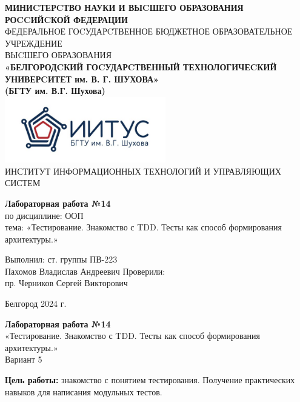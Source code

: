 \documentclass[a4paper,14pt]{extarticle}
\newcommand\textbox[1]{
	\parbox{.45\textwidth}{#1}
}
\begin{document}
\begin{center}
    \small{
        \textbf{МИНИCТЕРCТВО НАУКИ И ВЫCШЕГО ОБРАЗОВАНИЯ РОCCИЙCКОЙ ФЕДЕРАЦИИ}\\
        ФЕДЕРАЛЬНОЕ ГОCУДАРCТВЕННОЕ БЮДЖЕТНОЕ ОБРАЗОВАТЕЛЬНОЕ УЧРЕЖДЕНИЕ\\ВЫCШЕГО ОБРАЗОВАНИЯ \\
        \textbf{«БЕЛГОРОДCКИЙ ГОCУДАРCТВЕННЫЙ ТЕХНОЛОГИЧЕCКИЙ\\УНИВЕРCИТЕТ им. В. Г. ШУХОВА»\\ (БГТУ им. В.Г. Шухова)} \\
        \bigbreak
        \includegraphics[width=70mm]{log}\\
        ИНСТИТУТ ИНФОРМАЦИОННЫХ ТЕХНОЛОГИЙ И УПРАВЛЯЮЩИХ СИСТЕМ\\}
\end{center}

\vfill
\begin{center}
    \large{
        \textbf{
            Лабораторная работа №14}}\\
    \normalsize{
        по дисциплине: ООП \\
        тема: «Тестирование. Знакомство с TDD. Тесты как способ формирования
        архитектуры.»}
\end{center}
\vfill
\hfill\textbox{
    Выполнил: ст. группы ПВ-223\\Пахомов Владислав Андреевич
    \bigbreak
    Проверили: \\пр. Черников Сергей Викторович
}
\vfill\begin{center}
    Белгород 2024 г.
\end{center}
\newpage
\begin{center}
    \textbf{Лабораторная работа №14}\\
    «Тестирование. Знакомство с TDD. Тесты как способ формирования
    архитектуры.»\\
    Вариант 5
\end{center}
\textbf{Цель работы: }знакомство с понятием тестирования. Получение
практических навыков для написания модульных тестов.\\
\end{document}
